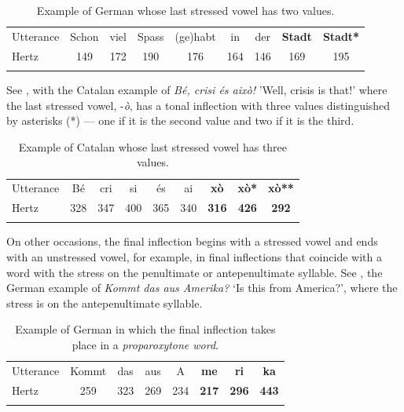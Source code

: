 \documentclass[output=paper]{langscibook}
\begin{document}
\begin{table}
\begin{tabularx}{\textwidth}{Xcccccccc}
\lsptoprule
Utterance & {Schon} & {viel} & {Spass} & {(ge)habt} & {in} & {der} & {\textbf{Stadt}} & {\textbf{Stadt}}\textbf{*}\\
Hertz & 149 & 172 & 190 & 176 & 164 & 146 & 169 & 195\\
\lspbottomrule
\end{tabularx}
\caption{\label{tab:font:1}Example of German whose last stressed vowel has two values.}
\end{table}

See , with the Catalan example of \textit{Bé, crisi és això!} 'Well, crisis is that!' where the last stressed vowel, -\textit{ò}, has a tonal inflection with three values distinguished by asterisks (*) — one if it is the second value and two if it is the third.

\begin{table}
\begin{tabularx}{\textwidth}{Xcccccccc}
\lsptoprule
Utterance & {Bé} & {cri} & {si} & {és} & {ai} & {\textbf{xò}} & {\textbf{xò*}} & {\textbf{xò**}}\\
Hertz & 328 & 347 & 400 & 365 & 340 & \textbf{316} & \textbf{426} & \textbf{292}\\
\lspbottomrule
\end{tabularx}
\caption{\label{tab:font:2}Example of Catalan whose last stressed vowel has three values.}
\end{table}

On other occasions, the final inflection begins with a stressed vowel and ends with an unstressed vowel, for example, in final inflections that coincide with a word with the stress on the penultimate or antepenultimate syllable. See , the German example of \textit{Kommt das aus Amerika?} ‘Is this from America?’, where the stress is on the antepenultimate syllable.

\begin{table}
\begin{tabularx}{\textwidth}{X*{7}{c}}
\lsptoprule
Utterance & Kommt & das & aus & A & \textbf{me} & \textbf{ri} & \textbf{ka}\\
Hertz & 259 & 323 & 269 & 234 & \textbf{217} & \textbf{296} & \textbf{443}\\
\lspbottomrule
\end{tabularx}
\caption{\label{tab:font:3}Example of German in which the final inflection takes place in a \textit{proparoxytone word}.}
\end{table}
\end{document}
